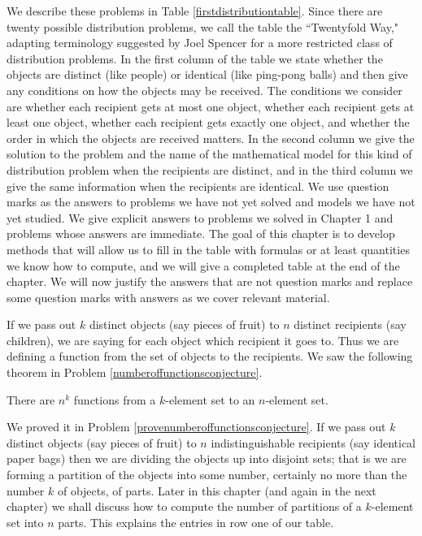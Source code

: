 We describe these problems in Table
\ref{firstdistributiontable}.  Since there are twenty possible
distribution problems, we call the table the ``Twentyfold
Way," adapting terminology suggested by Joel Spencer
for a more restricted class of distribution problems. In the first column
of the table we state whether the objects are distinct (like people) or
identical (like ping-pong balls) and then give any conditions on how the
objects may be received.  The conditions we consider are whether each
recipient gets at most one object, whether each recipient gets at least
one object, whether each recipient gets exactly one object, and whether
the order in which the objects are received matters.  In the second
column we give the solution to the problem and the name of the
mathematical model for this kind of distribution problem when the
recipients are distinct, and in the third column we give the same
information when the recipients are identical.  We use question marks as
the answers to problems we have not yet solved and models we have not yet
studied.   We give explicit answers to problems we solved in Chapter 1
and problems whose answers are immediate.  The goal of this chapter is to
develop methods that will allow us to fill in the table with formulas or
at least quantities we know how to compute, and we will give a completed
table at the end of the chapter.  We will now justify the answers that
are not question marks and replace some question
marks with answers as we cover relevant material. 

If we pass out  $k$ distinct objects (say pieces of fruit) to $n$ distinct
recipients (say children), we are saying for each object which recipient
it goes to.  Thus we are defining a function from the set of objects to
the recipients.  We saw the following theorem in Problem
\ref{numberoffunctionsconjecture}. 
\begin{theorem} There are
$n^k$ functions from a
$k$-element set to an $n$-element set.
\end{theorem} We proved it in Problem
\ref{provenumberoffunctionsconjecture}.   If we pass out $k$ distinct
objects (say pieces of fruit) to $n$ indistinguishable recipients (say
identical paper bags) then we are dividing the objects up into 
disjoint sets; that is we are forming a partition of the objects into
some number, certainly no more than the number $k$ of objects, of parts. 
Later in this chapter (and again in  the next chapter) we shall discuss
how to compute the number of partitions of a
$k$-element set into
$n$ parts.  This explains the entries in row one of our table.


